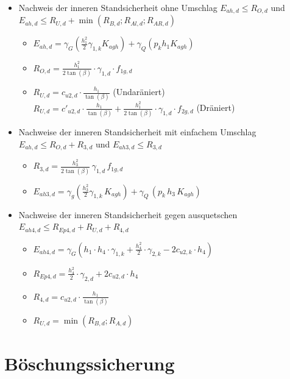 \documentclass[fleqn,twoside]{article}
\begin{document}
\begin{itemize}
    \item Nachweis der inneren Standsicherheit ohne Umschlag $E_{ah,d}\le R_{O,d}$ und $E_{ah,d}\le R_{U,d}+\min(R_{B,d};R_{Al,d};R_{AR,d})$
    \begin{itemize}
        \item $E_{ah,d}=\gamma_G\left(\frac{h_1^2}{2}\gamma_{1,k}K_{agh}\right)+\gamma_Q(p_kh_1K_{agh})$
        \item $R_{O,d}=\frac{h_1^2}{2\tan(\beta)}\cdot\gamma_{1,d}\cdot f_{1g,d}$
        \item $R_{U,d}=c_{u2,d}\cdot\frac{h_1}{\tan(\beta)}$ (Undaräniert)\\
        $R_{U,d}=c'_{u2,d}\cdot\frac{h_1}{\tan(\beta)}+\frac{h_1^2}{2\tan(\beta)}\cdot\gamma_{1,d}\cdot f_{2g,d}$ (Dräniert)
    \end{itemize}
    \item Nachweise der inneren Standsicherheit mit einfachem Umschlag $E_{ah,d}\le R_{O,d}+R_{3,d}$ und $E_{ah3,d}\le R_{3,d}$
    \begin{itemize}
        \item $R_{3,d}=\frac{h_3^2}{2\tan(\beta)}\,\gamma_{1,d}\,f_{1g,d}$
        \item $E_{ah3,d}=\gamma_g\left(\frac{h_3^2}{2}\gamma_{1,k}\,K_{agh}\right)+\gamma_Q\,(p_k\,h_3\,K_{agh})$
    \end{itemize}
    \item Nachweise der inneren Standsicherheit gegen ausquetschen $E_{ah4,d}\le R_{Ep4,d}+R_{U,d}+R_{4,d}$
    \begin{itemize}
        \item $E_{ah4,d}=\gamma_G\left(h_1\cdot h_4\cdot \gamma_{1,k}+\frac{h_4^2}{2}\cdot \gamma_{2,k}-2c_{u2,k}\cdot h_4\right)$
        \item $R_{Ep4,d}=\frac{h_4^2}{2}\cdot\gamma_{2,d}+2c_{u2,d}\cdot h_4$
        \item $R_{4,d}=c_{u2,d}\cdot\frac{h_1}{\tan(\beta)}$
        \item $R_{U,d}=\min(R_{B,d};R_{A,d})$
    \end{itemize}
\end{itemize}

\section{Böschungssicherung}
\end{document}
